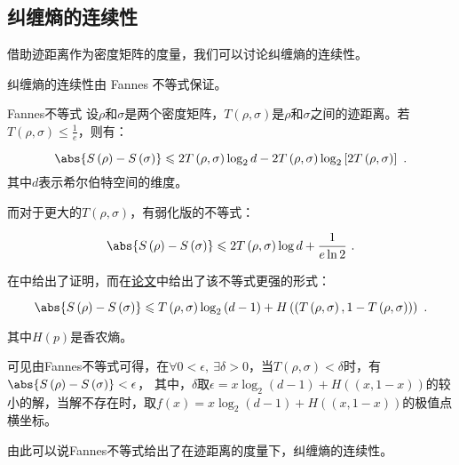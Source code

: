 \subsection{纠缠熵的连续性}

借助迹距离作为密度矩阵的度量，我们可以讨论纠缠熵的连续性。

纠缠熵的连续性由 Fannes 不等式保证。

\begin{theorem}{Fannes不等式}
设$\rho$和$\sigma$是两个密度矩阵，$T\left(\rho,\sigma\right)$是$\rho$和$\sigma$之间的迹距离。若$T\left(\rho,\sigma\right) \leqslant \frac{1}{e}$，则有：

\begin{equation}
\abs{S\left(\rho\right) - S\left(\sigma\right)} \leqslant 2T\left(\rho,\sigma\right)\log_2 d - 2T\left(\rho,\sigma\right) \log_2\left[ 2 T\left(\rho,\sigma\right)\right]~.
\end{equation}
其中$d$表示希尔伯特空间的维度。

\end{theorem}

而对于更大的$T\left(\rho,\sigma\right)$，有弱化版的不等式：

\begin{equation}
\abs{S\left(\rho\right) - S\left(\sigma\right)} \leqslant 2 T\left(\rho,\sigma\right)\log d + \frac{1}{e\ln 2}~.
\end{equation}

在\cite{量子信息}中给出了证明，而在\href{https://arxiv.org/pdf/quant-ph/0610146.pdf}{论文}中给出了该不等式更强的形式：

\begin{equation}
\abs{S\left(\rho\right) - S\left(\sigma\right)} \leqslant T\left(\rho,\sigma\right)\log_2\left(d-1\right) + H\left(\left(T\left(\rho,\sigma\right),1-T\left(\rho,\sigma\right)\right)\right)~.
\end{equation}

其中$H(p)$是香农熵。

可见由Fannes不等式可得，在$\forall 0<\epsilon,~\exists \delta>0$，当$T\left(\rho,\sigma\right)<\delta$时，有$\abs{S\left(\rho\right) - S\left(\sigma\right)}<\epsilon$，
其中，$\delta$取$\epsilon = x\log_2\left(d-1\right) + H\left(\left(x,1-x\right)\right)$的较小的解，当解不存在时，取$f(x)=x\log_2\left(d-1\right) + H\left(\left(x,1-x\right)\right)$的极值点横坐标。

由此可以说Fannes不等式给出了在迹距离的度量下，纠缠熵的连续性。